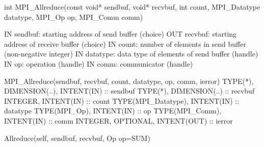 int MPI_Allreduce(const void* sendbuf,
  void* recvbuf, int count, MPI_Datatype datatype,
  MPI_Op op, MPI_Comm comm)

IN sendbuf: starting address of send buffer (choice)
OUT recvbuf: starting address of receive buffer (choice)
IN count: number of elements in send buffer (non-negative integer)
IN datatype: data type of elements of send buffer (handle)
IN op: operation (handle)
IN comm: communicator (handle)

MPI_Allreduce(sendbuf, recvbuf, count, datatype, op, comm, ierror)
TYPE(*), DIMENSION(..), INTENT(IN) :: sendbuf
TYPE(*), DIMENSION(..) :: recvbuf
INTEGER, INTENT(IN) :: count
TYPE(MPI_Datatype), INTENT(IN) :: datatype
TYPE(MPI_Op), INTENT(IN) :: op
TYPE(MPI_Comm), INTENT(IN) :: comm
INTEGER, OPTIONAL, INTENT(OUT) :: ierror


Allreduce(self, sendbuf, recvbuf, Op op=SUM)
